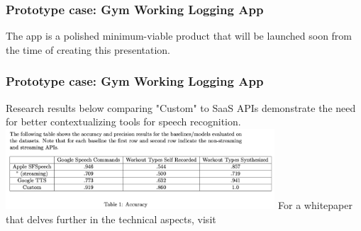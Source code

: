 \documentclass{beamer}
\begin{document}
\begin{frame}
\frametitle{Prototype case: Gym Working Logging App}
The app is a polished minimum-viable product that will be launched soon from the time of creating this presentation.
\end{frame}

\begin{frame}
\frametitle{Prototype case: Gym Working Logging App}
Research results below comparing "Custom" to SaaS APIs demonstrate the need for better contextualizing tools for speech recognition.
\vspace{1cm}
\centering
\includegraphics[height=3cm]{images/preliminary_results.png}
For a whitepaper that delves further in the technical aspects, visit 
\end{frame}
\end{document}
